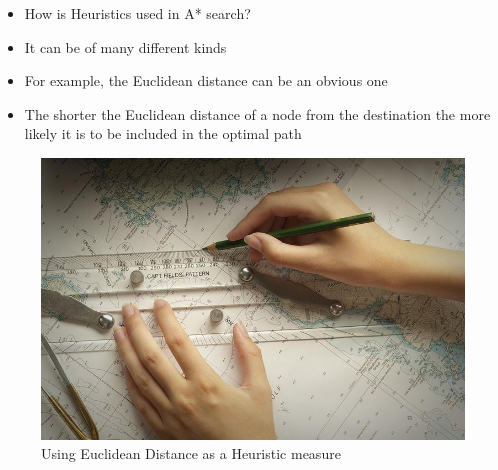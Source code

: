 \documentclass[14pt]{beamer}
\begin{document}
\begin{frame}
	
	\begin{itemize}
		\item<1-> How is Heuristics used in A* search? 
		\item<2-> It can be of many different kinds
		\item<3-> For example, the Euclidean distance can be an obvious one
		\item<4-> The shorter the Euclidean distance of a node from the destination the more likely it is to be included in the optimal path
	\end{itemize}

\end{frame}

\begin{frame}
	\begin{figure}[h]
	\centering
		\includegraphics[scale=0.4]{mapping.jpeg}
		\caption{Using Euclidean Distance as a Heuristic measure}
		\label{pic:mapping}
	\end{figure}
\end{frame}
\end{document}
